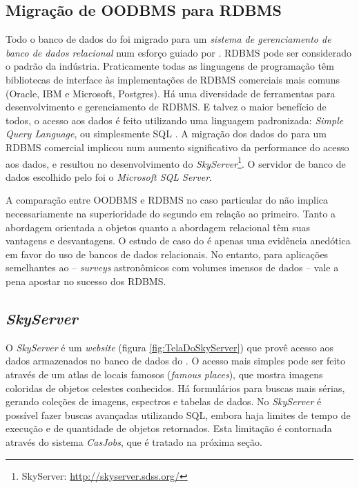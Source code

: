\subsection{Migração de OODBMS para RDBMS}
\label{sec:CrossMatch:SDSS:MigracaoRDBMS}

Todo o banco de dados do \SDSS foi migrado para um {\em sistema de gerenciamento
de banco de dados relacional} \citep[RDBMS;][]{Codd1970} num esforço guiado por
\citeauthor{Thakar2004}. RDBMS pode ser considerado o padrão da indústria.
Praticamente todas as linguagens de programação têm bibliotecas de interface às
implementações de RDBMS comerciais mais comuns (Oracle, IBM e Microsoft,
Postgres). Há uma diversidade de ferramentas para desenvolvimento e
gerenciamento de RDBMS. E talvez o maior benefício de todos, o acesso aos dados
é feito utilizando uma linguagem padronizada: {\em Simple Query Language}, ou
simplesmente SQL \citep{Chamberlin1974}. A migração dos dados do \SDSS para um
RDBMS comercial implicou num aumento significativo da performance do acesso aos
dados, e resultou no desenvolvimento do {\em SkyServer}\footnote{\SDSS
SkyServer: \url{http://skyserver.sdss.org/}}. O servidor de banco de dados
escolhido pelo \SDSS foi o {\em Microsoft SQL Server}.

A comparação entre OODBMS e RDBMS no caso particular do \SDSS não implica
necessariamente na superioridade do segundo em relação ao primeiro. Tanto a
abordagem orientada a objetos quanto a abordagem relacional têm suas vantagens e
desvantagens. O estudo de caso do \SDSS é apenas uma evidência anedótica em
favor do uso de bancos de dados relacionais. No entanto, para aplicações
semelhantes ao \SDSS -- {\em surveys} astronômicos com volumes imensos de dados
-- vale a pena apostar no sucesso dos RDBMS.

\subsection{{\em SkyServer}}
\label{sec:CrossMatch:SDSS:SkyServer}

O {\em SkyServer} é um {\em website} (figura \ref{fig:TelaDoSkyServer}) que
provê acesso aos dados armazenados no banco de dados do \SDSS
\citep{Szalay2002}. O acesso mais simples pode ser feito através de um atlas de
locais famosos ({\em famous places}), que mostra imagens coloridas de objetos
celestes conhecidos. Há formulários para buscas mais sérias, gerando coleções de
imagens, espectros e tabelas de dados. No {\em SkyServer} é possível fazer
buscas avançadas utilizando SQL, embora haja limites de tempo de execução e de
quantidade de objetos retornados. Esta limitação é contornada através do sistema
{\em CasJobs}, que é tratado na próxima seção.

